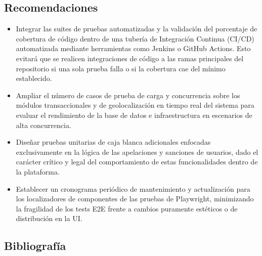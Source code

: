 \documentclass{article}
\begin{document}
\subsection{Recomendaciones}
\begin{itemize}
    \item Integrar las suites de pruebas automatizadas y la validación del porcentaje de cobertura de código dentro de una tubería de Integración Continua (CI/CD) automatizada mediante herramientas como Jenkins o GitHub Actions. Esto evitará que se realicen integraciones de código a las ramas principales del repositorio si una sola prueba falla o si la cobertura cae del mínimo establecido.
    \item Ampliar el número de casos de prueba de carga y concurrencia sobre los módulos transaccionales y de geolocalización en tiempo real del sistema para evaluar el rendimiento de la base de datos e infraestructura en escenarios de alta concurrencia.
    \item Diseñar pruebas unitarias de caja blanca adicionales enfocadas exclusivamente en la lógica de las apelaciones y sanciones de usuarios, dado el carácter crítico y legal del comportamiento de estas funcionalidades dentro de la plataforma.
    \item Establecer un cronograma periódico de mantenimiento y actualización para los localizadores de componentes de las pruebas de Playwright, minimizando la fragilidad de los tests E2E frente a cambios puramente estéticos o de distribución en la UI.
\end{itemize}

\subsection{Bibliografía}
\vspace{-3em}
\renewcommand{\refname}{}



\vfill
\end{document}
